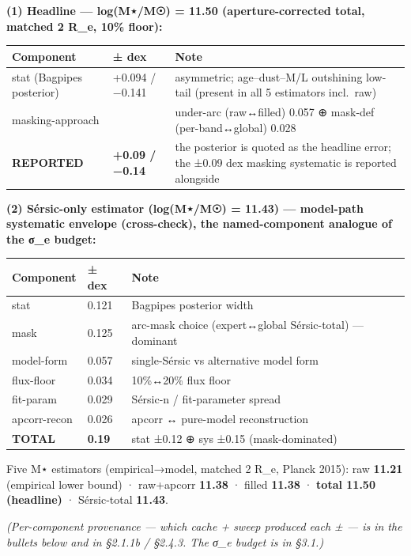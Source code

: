 \documentclass[
]{article}
\begin{document}
\textbf{(1) Headline --- log(M⋆/M☉) = 11.50 (aperture-corrected total,
matched 2 R\_e, 10\% floor):}

\begin{longtable}[]{@{}
  >{\raggedright\arraybackslash}p{}
  >{\raggedright\arraybackslash}p{}
  >{\raggedright\arraybackslash}p{}@{}}
\toprule
Component & ± dex & Note \\
\midrule
\endhead
stat (Bagpipes posterior) & +0.094 / −0.141 & asymmetric; age--dust--M/L
outshining low-tail (present in all 5 estimators incl.~raw) \\
masking-approach & 0.086 & under-arc (raw↔filled) 0.057 ⊕ mask-def
(per-band↔global) 0.028 \\
\textbf{REPORTED} & \textbf{+0.09 / −0.14} & the posterior is quoted as
the headline error; the ±0.09 dex masking systematic is reported
alongside \\
\bottomrule
\end{longtable}

\textbf{(2) Sérsic-only estimator (log(M⋆/M☉) = 11.43) --- model-path
systematic envelope (cross-check), the named-component analogue of the
σ\_e budget:}

\begin{longtable}[]{@{}lll@{}}
\toprule
Component & ± dex & Note \\
\midrule
\endhead
stat & 0.121 & Bagpipes posterior width \\
mask & 0.125 & arc-mask choice (expert↔global Sérsic-total) ---
dominant \\
model-form & 0.057 & single-Sérsic vs alternative model form \\
flux-floor & 0.034 & 10\%↔20\% flux floor \\
fit-param & 0.029 & Sérsic-n / fit-parameter spread \\
apcorr-recon & 0.026 & apcorr ↔ pure-model reconstruction \\
\textbf{TOTAL} & \textbf{0.19} & stat ±0.12 ⊕ sys ±0.15
(mask-dominated) \\
\bottomrule
\end{longtable}

Five M⋆ estimators (empirical→model, matched 2 R\_e, Planck 2015): raw
\textbf{11.21} (empirical lower bound) · raw+apcorr \textbf{11.38} ·
filled \textbf{11.38} · \textbf{total 11.50 (headline)} · Sérsic-total
\textbf{11.43}.

\emph{(Per-component provenance --- which cache + sweep produced each ±
--- is in the bullets below and in §2.1.1b / §2.4.3. The σ\_e budget is
in §3.1.)}
\end{document}
